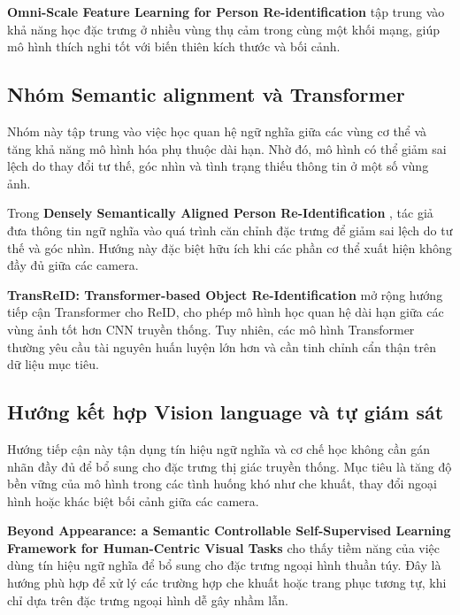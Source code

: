 \textbf{Omni-Scale Feature Learning for Person Re-identification} \cite{zhou2019omniscalefeaturelearningperson} tập trung vào khả năng học đặc trưng ở nhiều vùng thụ cảm trong cùng một khối mạng, giúp mô hình thích nghi tốt với biến thiên kích thước và bối cảnh.

\subsection{Nhóm Semantic alignment và Transformer}
Nhóm này tập trung vào việc học quan hệ ngữ nghĩa giữa các vùng cơ thể và tăng khả năng mô hình hóa phụ thuộc dài hạn. Nhờ đó, mô hình có thể giảm sai lệch do thay đổi tư thế, góc nhìn và tình trạng thiếu thông tin ở một số vùng ảnh.

Trong \textbf{Densely Semantically Aligned Person Re-Identification} \cite{zhang2019denselysemanticallyalignedperson}, tác giả đưa thông tin ngữ nghĩa vào quá trình căn chỉnh đặc trưng để giảm sai lệch do tư thế và góc nhìn. Hướng này đặc biệt hữu ích khi các phần cơ thể xuất hiện không đầy đủ giữa các camera.

\textbf{TransReID: Transformer-based Object Re-Identification} \cite{he2021transreidtransformerbasedobjectreidentification} mở rộng hướng tiếp cận Transformer cho ReID, cho phép mô hình học quan hệ dài hạn giữa các vùng ảnh tốt hơn CNN truyền thống. Tuy nhiên, các mô hình Transformer thường yêu cầu tài nguyên huấn luyện lớn hơn và cần tinh chỉnh cẩn thận trên dữ liệu mục tiêu.

\subsection{Hướng kết hợp Vision language và tự giám sát}
Hướng tiếp cận này tận dụng tín hiệu ngữ nghĩa và cơ chế học không cần gán nhãn đầy đủ để bổ sung cho đặc trưng thị giác truyền thống. Mục tiêu là tăng độ bền vững của mô hình trong các tình huống khó như che khuất, thay đổi ngoại hình hoặc khác biệt bối cảnh giữa các camera.

\textbf{Beyond Appearance: a Semantic Controllable Self-Supervised Learning Framework for Human-Centric Visual Tasks} \cite{chen2023appearancesemanticcontrollableselfsupervised} cho thấy tiềm năng của việc dùng tín hiệu ngữ nghĩa để bổ sung cho đặc trưng ngoại hình thuần túy. Đây là hướng phù hợp để xử lý các trường hợp che khuất hoặc trang phục tương tự, khi chỉ dựa trên đặc trưng ngoại hình dễ gây nhầm lẫn.

